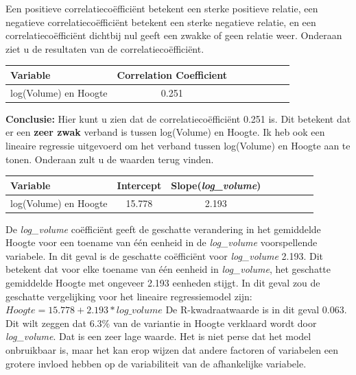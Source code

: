 \documentclass[12pt]{article}
\begin{document}
\newline\newline
Een positieve correlatiecoëfficiënt betekent een sterke positieve relatie, een negatieve correlatiecoëfficiënt betekent een sterke negatieve relatie, en een correlatiecoëfficiënt dichtbij nul geeft een zwakke of geen relatie weer.
Onderaan ziet u de resultaten van de correlatiecoëfficiënt.
\newline\newline
\begin{tabular}{l*{6}{c}r}
    Variable & Correlation Coefficient \\
    \hline
    log(Volume) en Hoogte & 0.251 \\
\end{tabular}
\newline\newline\newline
\textbf{Conclusie:} Hier kunt u zien dat de correlatiecoëfficiënt 0.251 is.
Dit betekent dat er een \textbf{zeer zwak} verband is tussen log(Volume) en Hoogte.
Ik heb ook een lineaire regressie uitgevoerd om het verband tussen log(Volume) en Hoogte aan te tonen.
Onderaan zult u de waarden terug vinden.
\newline\newline
\begin{tabular}{l*{6}{c}r}
    Variable & Intercept & Slope(\textit{log\_volume}) \\
    \hline
    log(Volume) en Hoogte & 15.778 & 2.193 \\
\end{tabular}
\newline\newline
De \textit{log\_volume} coëfficiënt geeft de geschatte verandering in het gemiddelde Hoogte voor een toename van één eenheid in de \textit{log\_volume} voorspellende variabele. 
In dit geval is de geschatte coëfficiënt voor \textit{log\_volume} 2.193. 
Dit betekent dat voor elke toename van één eenheid in \textit{log\_volume}, het geschatte gemiddelde Hoogte met ongeveer 2.193 eenheden stijgt.
In dit geval zou de geschatte vergelijking voor het lineaire regressiemodel zijn: $Hoogte = 15.778 + 2.193 * log\_volume$
De R-kwadraatwaarde is in dit geval 0.063. Dit wilt zeggen dat 6.3\% van de variantie in Hoogte verklaard wordt door \textit{log\_volume}.
Dat is een zeer lage waarde.
Het is niet perse dat het model onbruikbaar is, maar het kan erop wijzen dat andere factoren of variabelen een grotere invloed hebben op de variabiliteit van de afhankelijke variabele.
\end{document}
